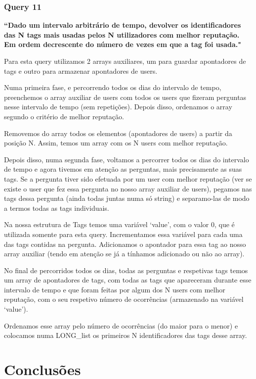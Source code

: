 \documentclass[a4paper]{report}
\begin{document}
\subsection*{Query 11}
\label{sec:query11}

\textbf{“Dado um intervalo arbitrário de tempo, devolver os identificadores das N tags
mais usadas pelos N utilizadores com melhor reputação. Em ordem decrescente do número
de vezes em que a tag foi usada."}

Para esta query utilizamos 2 arrays auxiliares, um para guardar apontadores de tags
e outro para armazenar apontadores de users.

Numa primeira fase, e percorrendo todos os dias do intervalo de tempo,
preenchemos o array auxiliar de users com todos os users que fizeram perguntas
nesse intervalo de tempo (sem repetições). Depois disso, ordenamos o array segundo
o critério de melhor reputação.

Removemos do array todos os elementos (apontadores de users) a partir da posição N.
Assim, temos um array com os N users com melhor reputação.

Depois disso, numa segunda fase, voltamos a percorrer todos os dias do intervalo
de tempo e agora tivemos em atenção as perguntas, mais precisamente as suas tags.
Se a pergunta tiver sido efetuada por um user com melhor reputação (ver se existe
o user que fez essa pergunta no nosso array auxiliar de users), pegamos nas tags
dessa pergunta (ainda todas juntas numa só string) e separamo-las de modo a termos
todas as tags individuais.

Na nossa estrutura de Tags temos uma variável \textsf{‘value’}, com o valor 0,
que é utilizada somente para esta query. Incrementamos essa variável para cada
uma das tags contidas na pergunta. Adicionamos o apontador para essa tag ao nosso
array auxiliar (tendo em atenção se já a tínhamos adicionado ou não ao array).

No final de percorridos todos os dias, todas as perguntas e respetivas tags
temos um array de apontadores de tags, com todas as tags que apareceram durante
esse intervalo de tempo e que foram feitas por algum dos N users com melhor reputação,
com o seu respetivo número de ocorrências (armazenado na variável \textsf{‘value’}).

Ordenamos esse array pelo número de ocorrências (do maior para o menor) e
colocamos numa LONG\_list os primeiros N identificadores das tags desse array.


\chapter{Conclusões}
\label{ch:conclusao}
\end{document}
